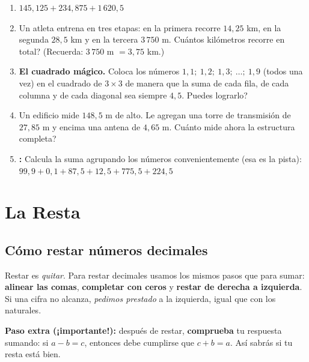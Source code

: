 \documentclass[12pt, letterpaper]{article}
\begin{document}
\begin{enumerate}[leftmargin=*]
  \item \dificil{} $145{,}125 + 234{,}875 + 1\,620{,}5$

  \item \dificil{} Un atleta entrena en tres etapas: en la primera recorre $14{,}25$ km, en la segunda $28{,}5$ km y en la tercera $3\,750$ m. \textquestiondown Cuántos kilómetros recorre en total? (Recuerda: $3\,750$ m $= 3{,}75$ km.)

  \item \dificil{} \textbf{El cuadrado mágico.} Coloca los números $1{,}1;\ 1{,}2;\ 1{,}3;\ \dots;\ 1{,}9$ (todos una vez) en el cuadrado de $3 \times 3$ de manera que la suma de cada fila, de cada columna y de cada diagonal sea siempre $4{,}5$. \textquestiondown Puedes lograrlo?

  \item \dificil{} Un edificio mide $148{,}5$ m de alto. Le agregan una torre de transmisión de $27{,}85$ m y encima una antena de $4{,}65$ m. \textquestiondown Cuánto mide ahora la estructura completa?

  \item \dificil{} \textbf{:} Calcula la suma agrupando los números convenientemente (esa es la pista): $99{,}9 + 0{,}1 + 87{,}5 + 12{,}5 + 775{,}5 + 224{,}5$
\end{enumerate}

\newpage

\section{La Resta}

\subsection{Cómo restar números decimales}

Restar es \emph{quitar}. Para restar decimales usamos los mismos pasos que para sumar: \textbf{alinear las comas}, \textbf{completar con ceros} y \textbf{restar de derecha a izquierda}. Si una cifra no alcanza, \emph{pedimos prestado} a la izquierda, igual que con los naturales.

\begin{cuadropasos}
  \textbf{Paso extra (¡importante!):} después de restar, \textbf{comprueba} tu respuesta sumando: si $a - b = c$, entonces debe cumplirse que $c + b = a$. Así sabrás si tu resta está bien.
\end{cuadropasos}
\end{document}
